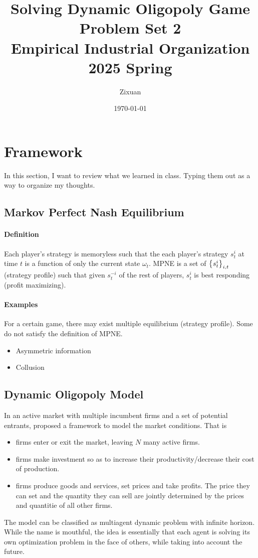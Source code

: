 \documentclass[12pt]{article}[margin=1in]
\title{\textbf{Solving Dynamic Oligopoly Game} \\
    \vspace{.3cm}
    \large Problem Set 2 \\
    Empirical Industrial Organization 2025 Spring}
\author{Zixuan}
\date{\today}
\begin{document}
\maketitle

\setcounter{page}{1}

\section{Framework}
In this section, I want to review what we learned in class. Typing them out as a way to organize my thoughts.
\subsection{Markov Perfect Nash Equilibrium}
\paragraph{Definition}
Each player's strategy is memoryless such that the each player's strategy $s_t^i$ at time $t$ is a function of only the current state $\omega_t$.
MPNE is a set of $\left\{s_t^i\right\}_{i,t}$ (strategy profile) such that given $s_t^{-i}$ of the rest of players, $s_t^i$ is best responding (profit maximizing).
\paragraph{Examples}
For a certain game, there may exist multiple equilibrium (strategy profile). Some do not satisfy the definition of MPNE.
\begin{itemize}
    \item Asymmetric information
    \item Collusion
\end{itemize}

\subsection{Dynamic Oligopoly Model}
In an active market with multiple incumbent firms and a set of potential entrants, \citet{ericson1995markov} proposed a framework to model the market conditions. That is
\begin{itemize}
    \item firms enter or exit the market, leaving $N$ many active firms.
    \item firms make investment so as to increase their productivity/decrease their cost of production.
    \item firms produce goods and services, set prices and take profits. The price they can set and the quantity they can sell are jointly determined by the prices and quantitie of all other firms.
\end{itemize}
The model can be classified as multiagent dynamic problem with infinite horizon. While the name is mouthful, the idea is essentially that each agent is solving its own optimization problem in the face of others, while taking into account the future.
\end{document}
